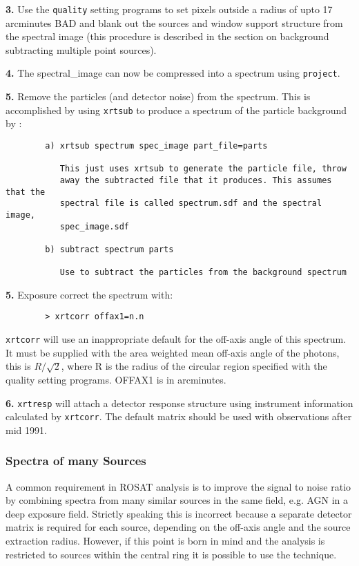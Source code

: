 \documentclass[11pt,fleqn]{article}    %
\begin{document}
{\bf 3.} Use the {\tt quality} setting programs to set pixels outside a 
    radius of upto 17 arcminutes BAD and blank out the sources 
    and window support structure from the spectral image (this
    procedure is described in the section on background subtracting
    multiple point sources). 

{\bf 4.} The spectral\_image can now be compressed into a spectrum
    using {\tt project}.

{\bf 5.} Remove the particles (and detector noise) from the spectrum.
    This is accomplished by using {\tt xrtsub} to produce a spectrum 
    of the particle background by :

\begin{verbatim}
        a) xrtsub spectrum spec_image part_file=parts

           This just uses xrtsub to generate the particle file, throw
           away the subtracted file that it produces. This assumes that the
           spectral file is called spectrum.sdf and the spectral image,
           spec_image.sdf

        b) subtract spectrum parts

           Use to subtract the particles from the background spectrum
\end{verbatim}

{\bf 5.} Exposure correct the spectrum with:

\begin{verbatim}
        > xrtcorr offax1=n.n
\end{verbatim}

{\tt xrtcorr} will use an inappropriate default for the off-axis angle of this
spectrum. It must be supplied with the area weighted mean off-axis
angle of the photons, this is $R/\sqrt{2}$, where R is
the radius of the circular region specified with the quality setting
programs. OFFAX1 is in arcminutes.

{\bf 6.} {\tt xrtresp} will attach a detector response structure using
instrument information calculated by {\tt xrtcorr}.  The default matrix should
be used with observations after mid 1991.  

\subsubsection{Spectra of many Sources}
A common requirement in ROSAT analysis is to improve the signal to 
noise ratio by combining spectra from many similar sources in the same
field, e.g. AGN in a deep exposure field. Strictly speaking this is 
incorrect because a separate detector matrix is required for
each source, depending 
on the off-axis angle and the source extraction radius. However, if this
point is born in mind and the analysis is restricted to sources within
the central ring it is possible to use the technique.
\end{document}
